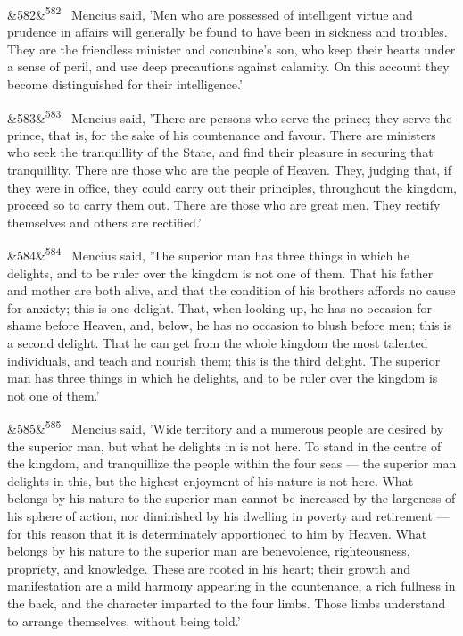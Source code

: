 \documentclass[12pt]{article}
\newcommand{\para}[1][]{\par\noindent\ifx&#1&\else\textsuperscript{\footnotesize #1}~\fi}
\begin{document}
\para[582] Mencius said, 'Men who are possessed of intelligent virtue and prudence in affairs will generally be found to have been in sickness and troubles. They are the friendless minister and concubine's son, who keep their hearts under a sense of peril, and use deep precautions against calamity. On this account they become distinguished for their intelligence.'

\para[583] Mencius said, 'There are persons who serve the prince; they serve the prince, that is, for the sake of his countenance and favour. There are ministers who seek the tranquillity of the State, and find their pleasure in securing that tranquillity. There are those who are the people of Heaven. They, judging that, if they were in office, they could carry out their principles, throughout the kingdom, proceed so to carry them out. There are those who are great men. They rectify themselves and others are rectified.'

\para[584] Mencius said, 'The superior man has three things in which he delights, and to be ruler over the kingdom is not one of them. That his father and mother are both alive, and that the condition of his brothers affords no cause for anxiety; this is one delight. That, when looking up, he has no occasion for shame before Heaven, and, below, he has no occasion to blush before men; this is a second delight. That he can get from the whole kingdom the most talented individuals, and teach and nourish them; this is the third delight. The superior man has three things in which he delights, and to be ruler over the kingdom is not one of them.'

\para[585] Mencius said, 'Wide territory and a numerous people are desired by the superior man, but what he delights in is not here. To stand in the centre of the kingdom, and tranquillize the people within the four seas --- the superior man delights in this, but the highest enjoyment of his nature is not here. What belongs by his nature to the superior man cannot be increased by the largeness of his sphere of action, nor diminished by his dwelling in poverty and retirement --- for this reason that it is determinately apportioned to him by Heaven. What belongs by his nature to the superior man are benevolence, righteousness, propriety, and knowledge. These are rooted in his heart; their growth and manifestation are a mild harmony appearing in the countenance, a rich fullness in the back, and the character imparted to the four limbs. Those limbs understand to arrange themselves, without being told.'
\end{document}
